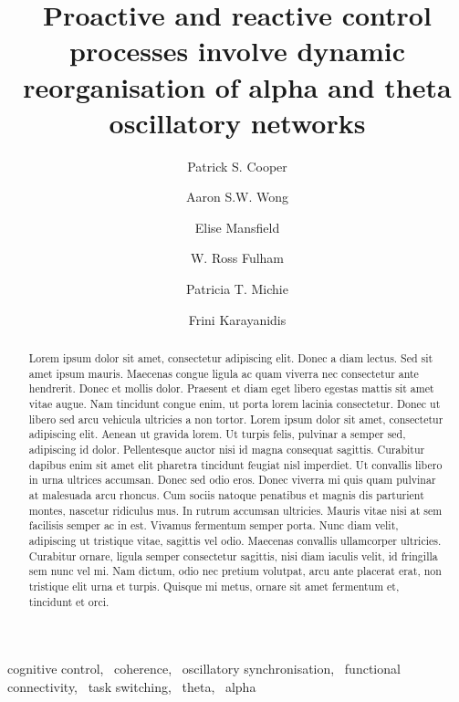 \documentclass[preprint,authoryear,11pt,5p,times,twocolumns]{elsarticle}
\begin{document}
\begin{frontmatter}

\title{Proactive and reactive control processes involve dynamic reorganisation of alpha and theta oscillatory networks}
\author[label1,label2,label3]{Patrick S. Cooper}
\author[label2,label4]{Aaron S.W. Wong}
\author[label1,label2,label3]{Elise Mansfield}
\author[label1,label2,label3]{W. Ross Fulham}
\author[label1,label2,label3]{Patricia T. Michie}
\author[label1,label2,label3]{Frini Karayanidis}
\address[label1]{School of Psychology, Universtiy of Newcastle}
\address[label2]{Functional Neuroimaging Laboratory, University of Newcastle}
\address[label3]{Hunter Medical Research Institute, University of Newcastle}
\address[label4]{School of Engineering, University of Newcastle}

\begin{abstract}
Lorem ipsum dolor sit amet, consectetur adipiscing elit. Donec a diam lectus. Sed sit amet ipsum mauris. Maecenas congue ligula ac quam viverra nec consectetur ante hendrerit. Donec et mollis dolor. Praesent et diam eget libero egestas mattis sit amet vitae augue. Nam tincidunt congue enim, ut porta lorem lacinia consectetur. Donec ut libero sed arcu vehicula ultricies a non tortor. Lorem ipsum dolor sit amet, consectetur adipiscing elit. Aenean ut gravida lorem. Ut turpis felis, pulvinar a semper sed, adipiscing id dolor. Pellentesque auctor nisi id magna consequat sagittis. Curabitur dapibus enim sit amet elit pharetra tincidunt feugiat nisl imperdiet. Ut convallis libero in urna ultrices accumsan. Donec sed odio eros. Donec viverra mi quis quam pulvinar at malesuada arcu rhoncus. Cum sociis natoque penatibus et magnis dis parturient montes, nascetur ridiculus mus. In rutrum accumsan ultricies. Mauris vitae nisi at sem facilisis semper ac in est. Vivamus fermentum semper porta. Nunc diam velit, adipiscing ut tristique vitae, sagittis vel odio. Maecenas convallis ullamcorper ultricies. Curabitur ornare, ligula semper consectetur sagittis, nisi diam iaculis velit, id fringilla sem nunc vel mi. Nam dictum, odio nec pretium volutpat, arcu ante placerat erat, non tristique elit urna et turpis. Quisque mi metus, ornare sit amet fermentum et, tincidunt et orci.
\end{abstract}

\begin{keyword}
cognitive control, \ coherence, \ oscillatory synchronisation, \ functional connectivity, \ task switching, 
\ theta, \ alpha
\end{keyword}

\end{frontmatter}
\end{document}
